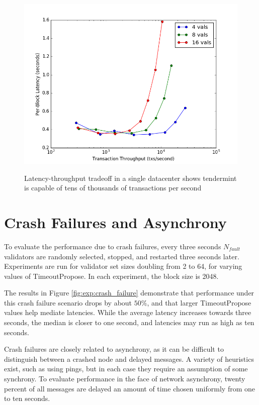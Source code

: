 \begin{figure}[]
	\includegraphics[width=\linewidth,height=\textheight,keepaspectratio]{figures/single_datacenter/latency-throughput.png}
    	\centering
	\label{fig:exp:single}
	\caption[Latency-throughput in non-faulty network, single data center]{Latency-throughput tradeoff in a single datacenter shows tendermint is capable of tens of thousands of transactions per second}
\end{figure}

\section{Crash Failures and Asynchrony}

To evaluate the performance due to crash failures, every three seconds $N_{fault}$ validators are randomly selected,
stopped, and restarted three seconds later.
Experiments are run for validator set sizes doubling from 2 to 64, for varying values of TimeoutPropose.
In each experiment, the block size is 2048.

The results in Figure \ref{fig:exp:crash_failure} demonstrate that performance under this crash failure scenario drops by about 
$50\%$, and that larger TimeoutPropose values help mediate latencies. While the average latency increases towards three seconds,
the median is closer to one second, and latencies may run as high as ten seconds.

Crash failures are closely related to asynchrony, as it can be difficult to distinguish between a crashed node
and delayed messages. A variety of heuristics exist, such as using pings, 
but in each case they require an assumption of some synchrony. 
To evaluate performance in the face of network asynchrony, twenty percent of all messages are delayed an amount of time chosen uniformly 
from one to ten seconds.

